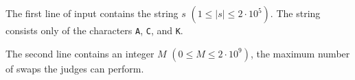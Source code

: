 
The first line of input contains the string $s$ $(1 \leq |s| \leq 2 \cdot 10^{5})$. The string consists only of the characters \texttt{A}, \texttt{C}, and \texttt{K}.

The second line contains an integer $M$ $(0 \leq M \leq 2 \cdot 10^{9})$, the maximum number of swaps the judges can perform.

